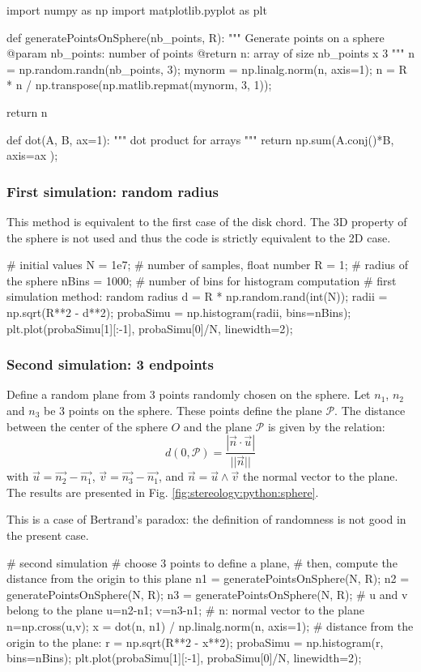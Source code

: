 \begin{python}
import numpy as np
import matplotlib.pyplot as plt

def generatePointsOnSphere(nb_points, R):
    """
    Generate points on a sphere
    @param nb_points: number of points
    @return n: array of size nb_points x 3
    """
    n = np.random.randn(nb_points, 3);
    mynorm = np.linalg.norm(n, axis=1);
    n = R * n / np.transpose(np.matlib.repmat(mynorm, 3, 1));
    
    return n

def dot(A, B, ax=1):
    """ dot product for arrays
    """
    return np.sum(A.conj()*B, axis=ax );
\end{python}

\subsubsection{First simulation: random radius}

This method is equivalent to the first case of the disk chord. The 3D property of the sphere is not used and thus the code is strictly equivalent to the 2D case.

\begin{python}
# initial values	 
N = 1e7;      # number of samples, float number
R = 1;        # radius of the sphere
nBins = 1000; # number of bins for histogram computation
# first simulation method: random radius
d = R * np.random.rand(int(N));
radii = np.sqrt(R**2 - d**2);
probaSimu = np.histogram(radii, bins=nBins);
plt.plot(probaSimu[1][:-1], probaSimu[0]/N, linewidth=2);
\end{python}

\subsubsection{Second simulation: 3 endpoints}
Define a random plane from 3 points randomly chosen on the sphere. Let $n_1$, $n_2$ and $n_3$ be 3 points on the sphere. These points define the plane $\mathcal{P}$.
The distance between the center of the sphere $O$ and the plane $\mathcal{P}$ is given by the relation:
$$d(0, \mathcal{P})=\frac{|\vec{n}\cdot\vec{u}|}{||\vec{n}||}$$
with $\vec{u}=\vec{n_2}-\vec{n_1}$, $\vec{v}=\vec{n_3}-\vec{n_1}$, and $\vec{n}=\vec{u} \wedge\vec{v}$ the normal vector to the plane. The results are presented in Fig. \ref{fig:stereology:python:sphere}.

This is a case of Bertrand's paradox: the definition of randomness is not good in the present case.
\begin{python}
# second simulation
# choose 3 points to define a plane,
# then, compute the distance from the origin to this plane
n1 = generatePointsOnSphere(N, R);
n2 = generatePointsOnSphere(N, R);
n3 = generatePointsOnSphere(N, R);
# u and v belong to the plane
u=n2-n1;
v=n3-n1;
# n: normal vector to the plane
n=np.cross(u,v);
x = dot(n, n1) / np.linalg.norm(n, axis=1);
# distance from the origin to the plane:
r = np.sqrt(R**2 - x**2);
probaSimu = np.histogram(r, bins=nBins);
plt.plot(probaSimu[1][:-1], probaSimu[0]/N, linewidth=2);
\end{python}

